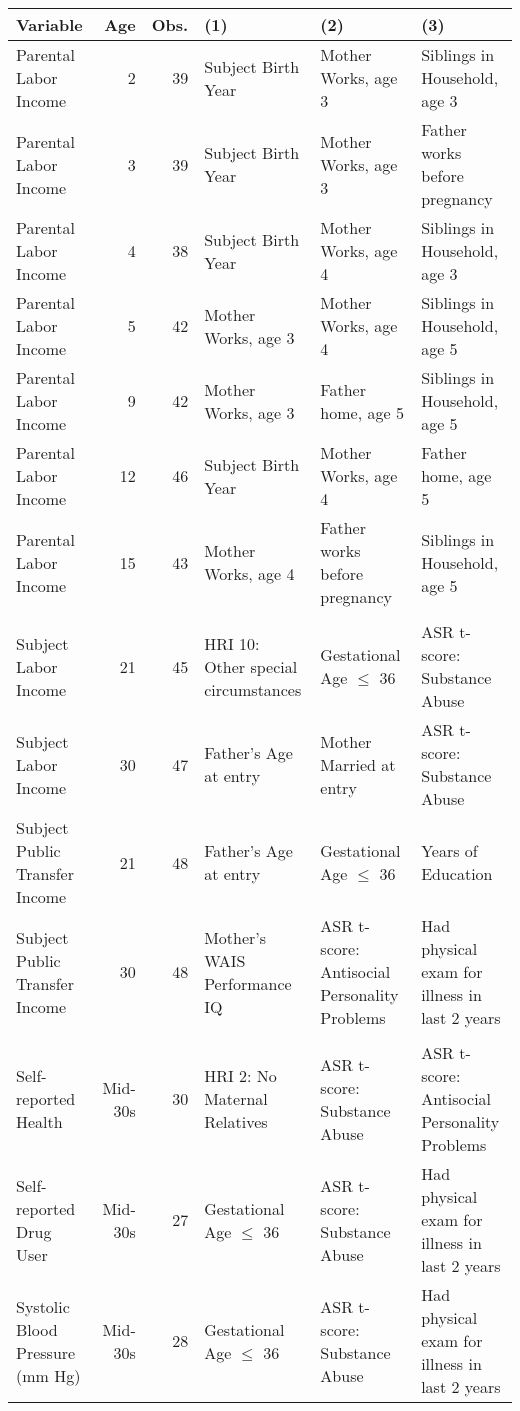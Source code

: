 \tiny
\begin{tabular}{l r r l l l}
\toprule											
Variable	&	Age	&	Obs.	&	(1)	&	(2)	&	(3)	\\
\midrule											
Parental Labor Income	&	2	&	39	&	Subject Birth Year	&	Mother Works, age 3	&	Siblings in Household, age 3	\\
Parental Labor Income	&	3	&	39	&	Subject Birth Year	&	Mother Works, age 3	&	Father works before pregnancy	\\
Parental Labor Income	&	4	&	38	&	Subject Birth Year	&	Mother Works, age 4	&	Siblings in Household, age 3	\\
Parental Labor Income	&	5	&	42	&	Mother Works, age 3	&	Mother Works, age 4	&	Siblings in Household, age 5	\\
Parental Labor Income	&	9	&	42	&	Mother Works, age 3	&	Father home, age 5	&	Siblings in Household, age 5	\\
Parental Labor Income	&	12	&	46	&	Subject Birth Year	&	Mother Works, age 4	&	Father home, age 5	\\
Parental Labor Income	&	15	&	43	&	Mother Works, age 4	&	Father works before pregnancy	&	Siblings in Household, age 5	\\
\\
Subject Labor Income	&	21	&	45	&	HRI 10: Other special circumstances	&	Gestational Age $\leq$ 36	&	ASR t-score: Substance Abuse	\\
Subject Labor Income	&	30	&	47	&	Father's Age at entry	&	Mother Married at entry	&	ASR t-score: Substance Abuse	\\
Subject Public Transfer Income	&	21	&	48	&	Father's Age at entry	&	Gestational Age $\leq$ 36	&	Years of Education	\\
Subject Public Transfer Income	&	30	&	48	&	Mother's WAIS Performance IQ	&	ASR t-score: Antisocial Personality Problems	&	Had physical exam for illness in last 2 years	\\
\\
Self-reported Health	&	Mid-30s	&	30	&	HRI 2: No Maternal Relatives	&	ASR t-score: Substance Abuse	&	ASR t-score: Antisocial Personality Problems	\\
Self-reported Drug User	&	Mid-30s	&	27	&	Gestational Age $\leq$ 36	&	ASR t-score: Substance Abuse	&	Had physical exam for illness in last 2 years	\\
Systolic Blood Pressure (mm Hg)	&	Mid-30s	&	28	&	Gestational Age $\leq$ 36	&	ASR t-score: Substance Abuse	&	Had physical exam for illness in last 2 years	\\

\end{tabular}
